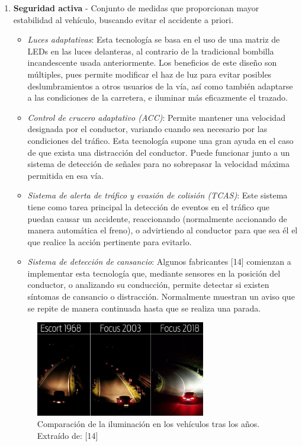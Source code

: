 \begin{enumerate}
    \item \textbf{Seguridad activa} - Conjunto de medidas que proporcionan mayor estabilidad al vehículo, buscando evitar el accidente a priori.
    \begin{itemize}
        \item \textit{Luces adaptativas}: Esta tecnología se basa en el uso de una matriz de LEDs en las luces delanteras, al contrario de la tradicional bombilla incandescente usada anteriormente. Los beneficios de este diseño son múltiples, pues permite modificar el haz de luz para evitar posibles deslumbramientos a otros usuarios de la vía, así como también adaptarse a las condiciones de la carretera, e iluminar más eficazmente el trazado.


     
        \item \textit{Control de crucero adaptativo (ACC)}: Permite mantener una velocidad designada por el conductor, variando cuando sea necesario por las condiciones del tráfico. Esta tecnología supone una gran ayuda en el caso de que exista una distracción del conductor. Puede funcionar junto a un sistema de detección de señales para no sobrepasar la velocidad máxima permitida en esa vía.
    
        \item \textit{Sistema de alerta de tráfico y evasión de colisión (TCAS)}: Este sistema tiene como tarea principal la detección de eventos en el tráfico que puedan causar un accidente, reaccionando (normalmente accionando de manera automática el freno), o advirtiendo al conductor para que sea él el que realice la acción pertinente para evitarlo.

        \item \textit{Sistema de detección de cansancio}: Algunos fabricantes [14] comienzan a implementar esta tecnología que, mediante sensores en la posición del conductor, o analizando su conducción, permite detectar si existen síntomas de cansancio o distracción. Normalmente muestran un aviso que se repite de manera continuada hasta que se realiza una parada. 
\end{itemize}

\begin{figure}[h]
    \centering
    \includegraphics[width=0.7\textwidth]{imagenes/adaptive_lights.png}
    \caption{Comparación de la iluminación en los vehículos tras los años. Extraído de: [14]}
\end{figure}



\end{enumerate}
